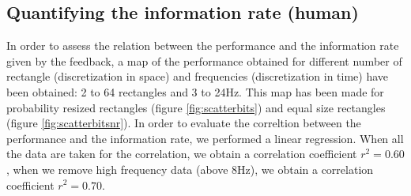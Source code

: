 \documentclass[preprint,12pt]{elsarticle}
\begin{document}
\subsection{Quantifying the information rate (human)}
In order to assess the relation between the performance and the information rate given by the feedback, a map of the performance obtained for different number of rectangle (discretization in space) and frequencies (discretization in time) have been obtained: 2 to 64 rectangles and 3 to 24Hz. This map has been made for probability resized rectangles (figure \ref{fig:scatterbits}) and equal size rectangles (figure \ref{fig:scatterbitsnr}). In order to evaluate the correltion between the performance and the information rate, we performed a linear regression. When all the data are taken for the correlation, we obtain a correlation coefficient $r^2 = 0.60$, when we remove high frequency data (above 8Hz), we obtain a correlation coefficient $r^2 = 0.70$. 
\end{document}
